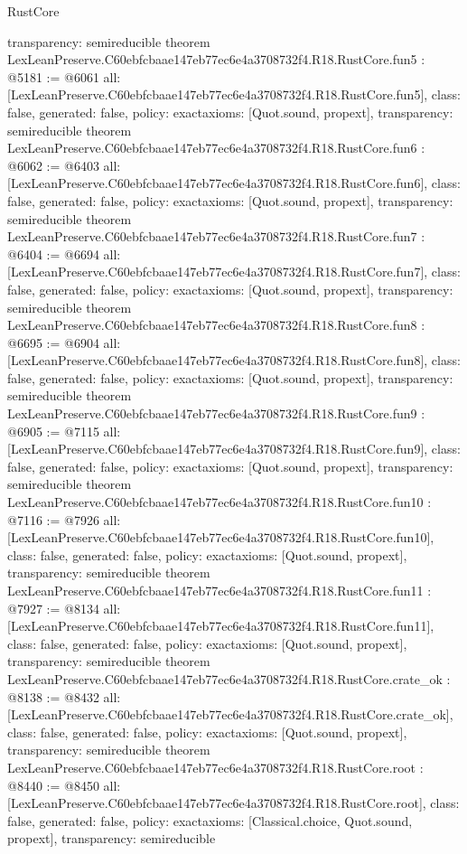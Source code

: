 \begin{lexlean}{RustCore}
\begin{coremodule}
{  transparency: semireducible
}
theorem LexLeanPreserve.C60ebfcbaae147eb77ec6e4a3708732f4.R18.RustCore.fun5 : @5181 := @6061 {
  all: [LexLeanPreserve.C60ebfcbaae147eb77ec6e4a3708732f4.R18.RustCore.fun5],
  class: false,
  generated: false,
  policy: exact{axioms: [Quot.sound, propext]},
  transparency: semireducible
}
theorem LexLeanPreserve.C60ebfcbaae147eb77ec6e4a3708732f4.R18.RustCore.fun6 : @6062 := @6403 {
  all: [LexLeanPreserve.C60ebfcbaae147eb77ec6e4a3708732f4.R18.RustCore.fun6],
  class: false,
  generated: false,
  policy: exact{axioms: [Quot.sound, propext]},
  transparency: semireducible
}
theorem LexLeanPreserve.C60ebfcbaae147eb77ec6e4a3708732f4.R18.RustCore.fun7 : @6404 := @6694 {
  all: [LexLeanPreserve.C60ebfcbaae147eb77ec6e4a3708732f4.R18.RustCore.fun7],
  class: false,
  generated: false,
  policy: exact{axioms: [Quot.sound, propext]},
  transparency: semireducible
}
theorem LexLeanPreserve.C60ebfcbaae147eb77ec6e4a3708732f4.R18.RustCore.fun8 : @6695 := @6904 {
  all: [LexLeanPreserve.C60ebfcbaae147eb77ec6e4a3708732f4.R18.RustCore.fun8],
  class: false,
  generated: false,
  policy: exact{axioms: [Quot.sound, propext]},
  transparency: semireducible
}
theorem LexLeanPreserve.C60ebfcbaae147eb77ec6e4a3708732f4.R18.RustCore.fun9 : @6905 := @7115 {
  all: [LexLeanPreserve.C60ebfcbaae147eb77ec6e4a3708732f4.R18.RustCore.fun9],
  class: false,
  generated: false,
  policy: exact{axioms: [Quot.sound, propext]},
  transparency: semireducible
}
theorem LexLeanPreserve.C60ebfcbaae147eb77ec6e4a3708732f4.R18.RustCore.fun10 : @7116 := @7926 {
  all: [LexLeanPreserve.C60ebfcbaae147eb77ec6e4a3708732f4.R18.RustCore.fun10],
  class: false,
  generated: false,
  policy: exact{axioms: [Quot.sound, propext]},
  transparency: semireducible
}
theorem LexLeanPreserve.C60ebfcbaae147eb77ec6e4a3708732f4.R18.RustCore.fun11 : @7927 := @8134 {
  all: [LexLeanPreserve.C60ebfcbaae147eb77ec6e4a3708732f4.R18.RustCore.fun11],
  class: false,
  generated: false,
  policy: exact{axioms: [Quot.sound, propext]},
  transparency: semireducible
}
theorem LexLeanPreserve.C60ebfcbaae147eb77ec6e4a3708732f4.R18.RustCore.crate_ok : @8138 := @8432 {
  all: [LexLeanPreserve.C60ebfcbaae147eb77ec6e4a3708732f4.R18.RustCore.crate_ok],
  class: false,
  generated: false,
  policy: exact{axioms: [Quot.sound, propext]},
  transparency: semireducible
}
theorem LexLeanPreserve.C60ebfcbaae147eb77ec6e4a3708732f4.R18.RustCore.root : @8440 := @8450 {
  all: [LexLeanPreserve.C60ebfcbaae147eb77ec6e4a3708732f4.R18.RustCore.root],
  class: false,
  generated: false,
  policy: exact{axioms: [Classical.choice, Quot.sound, propext]},
  transparency: semireducible
}


\end{coremodule}
\end{lexlean}
